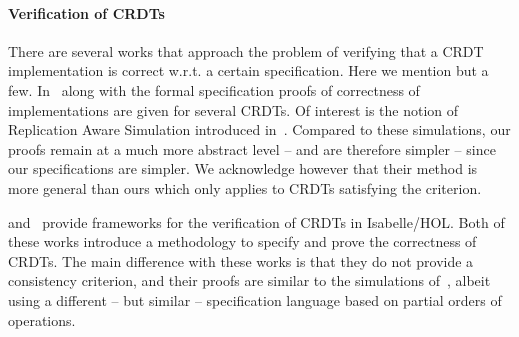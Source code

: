 \paragraph{Verification of CRDTs}
There are several works that approach the problem of verifying that a
CRDT implementation is correct w.r.t. a certain specification.
%
Here we mention but a few.
%
In~\cite{BurckhardtGYZ14, AttiyaBGMYZ16, Burckhardt14} along with the
formal specification proofs of correctness of implementations are
given for several CRDTs.
%
Of interest is the notion of Replication Aware Simulation introduced
in~\cite{BurckhardtGYZ14}.
%
Compared to these simulations, our proofs remain at a much more
abstract level -- and are therefore simpler -- since our
specifications are simpler.
%
We acknowledge however that their method is more general than ours
which only applies to CRDTs satisfying the \CRDTLinshort{} criterion.

\citet{ZellerBP14} and~\citet{GomesKMB17} provide frameworks for the
verification of CRDTs in Isabelle/HOL.
%
Both of these works introduce a methodology to specify and prove the
correctness of CRDTs.
%
The main difference with these works is that they do not provide a
consistency criterion, and their proofs are similar to the simulations
of~\cite{BurckhardtGYZ14}, albeit using a different -- but similar --
specification language based on partial orders of operations.

